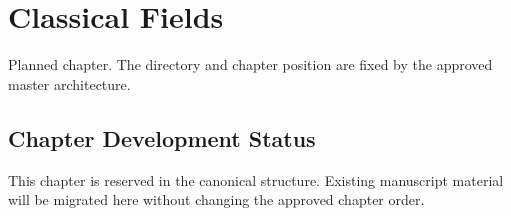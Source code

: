 \chapter{Classical Fields}
\label{chap:12-classical-fields}

\begin{roadmapbox}
Planned chapter. The directory and chapter position are fixed by the approved master architecture.
\end{roadmapbox}

\section*{Chapter Development Status}
This chapter is reserved in the canonical structure. Existing manuscript material will be migrated here without changing the approved chapter order.
